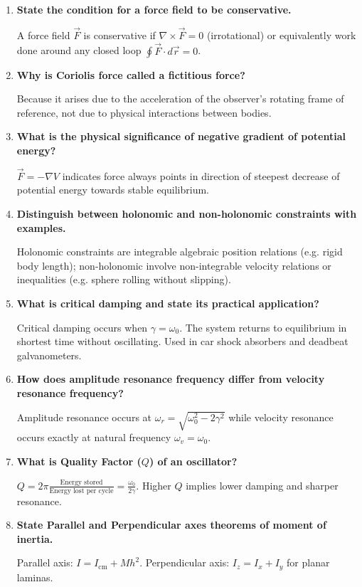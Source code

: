 \documentclass[12pt,a4paper]{article}
\newcommand{\Q}[1]{\textbf{#1}\par\noindent\ignorespaces}
\begin{document}
\begin{tcolorbox}[exambox, title={\textbf{Frequently Asked / Viva Questions}}]
\begin{enumerate}[topsep=0pt, label=\textbf{Q\arabic*.}, itemsep=5pt]
  \item \Q{State the condition for a force field to be conservative.}
  A force field $\vec{F}$ is conservative if $\nabla \times \vec{F} = 0$ (irrotational) or equivalently work done around any closed loop $\oint \vec{F} \cdot d\vec{r} = 0$.

  \item \Q{Why is Coriolis force called a fictitious force?}
  Because it arises due to the acceleration of the observer's rotating frame of reference, not due to physical interactions between bodies.

  \item \Q{What is the physical significance of negative gradient of potential energy?}
  $\vec{F} = -\nabla V$ indicates force always points in direction of steepest decrease of potential energy towards stable equilibrium.

  \item \Q{Distinguish between holonomic and non-holonomic constraints with examples.}
  Holonomic constraints are integrable algebraic position relations (e.g. rigid body length); non-holonomic involve non-integrable velocity relations or inequalities (e.g. sphere rolling without slipping).

  \item \Q{What is critical damping and state its practical application?}
  Critical damping occurs when $\gamma = \omega_0$. The system returns to equilibrium in shortest time without oscillating. Used in car shock absorbers and deadbeat galvanometers.

  \item \Q{How does amplitude resonance frequency differ from velocity resonance frequency?}
  Amplitude resonance occurs at $\omega_r = \sqrt{\omega_0^2 - 2\gamma^2}$ while velocity resonance occurs exactly at natural frequency $\omega_v = \omega_0$.

  \item \Q{What is Quality Factor ($Q$) of an oscillator?}
  $Q = 2\pi \frac{\text{Energy stored}}{\text{Energy lost per cycle}} = \frac{\omega_0}{2\gamma}$. Higher $Q$ implies lower damping and sharper resonance.

  \item \Q{State Parallel and Perpendicular axes theorems of moment of inertia.}
  Parallel axis: $I = I_{\text{cm}} + Mh^2$. Perpendicular axis: $I_z = I_x + I_y$ for planar laminas.


\end{enumerate}
\end{tcolorbox}
\end{document}

